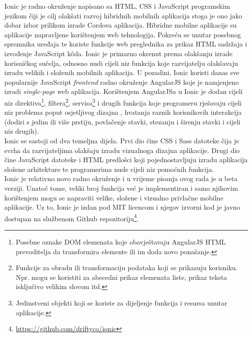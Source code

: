 Ionic je radno okruženje napisano sa HTML, CSS i JavaScript programskim jezikom čiji je cilj olakšati razvoj hibridnih mobilnih aplikacija stoga je ono jako dobar izbor prilikom izrade Cordova aplikacija. 
Hibridne mobilne aplikacije su aplikacije napravljene korištenjem web tehnologija. 
Pokreću se unutar posebnog spremnika uređaja te koriste funkcije web preglednika za prikaz HTML sadržaja i izvođenje JavaScript kôda.
Ionic je primarno okrenut prema olakšanju izrade korisničkog sučelja, odnosno nudi cijeli niz funkcija koje razvijatelju olakšavaju izradu velikih i složenih mobilnih aplikacija. 
U pozadini, Ionic koristi danas sve popularnije JavaScript \textit{frontend} radno okruženje AngularJS koje je namjenjeno izradi \textit{single-page} web aplikacija. 
Korištenjem AngularJSa u Ionic je dodan cijeli niz direktiva\footnote{Posebne oznake DOM elemenata koje obavještavaju AngularJS HTML prevoditelja da transformira elemente ili im doda novo ponašanje.}, filtera\footnote{Funkcije za obradu ili transformaciju podataka koji se prikazuju korisniku. 
Npr. mogu se koristiti za abecedni prikaz elemenata liste, prikaz teksta isključivo velikim slovom itd.}, servisa\footnote{Jedinstveni objekti  koji se koriste za dijeljenje funkcija i resursa unutar aplikacije.} i drugih funkcija koje programeru rješavaju cijeli niz problema poput osjetljivog dizajna , hvatanja raznih korisnikovih interakcija (dodiri s jedim ili više prstiju, povlačenje  stavki, stezanju i širenju stavki  i cijeli niz drugih). 
\\

Ionic se sastoji od dva temeljna dijela. 
Prvi dio čine CSS i Sass datoteke čija je svrha da razvijateljima olakšaju izradu vizualnoga dizajna aplikacije. 
Drugi dio čine JavaScript datoteke i HTML predlošci koji pojednostavljuju izradu aplikacija složene arhitekture te programerima nude cijeli niz pomoćnih funkcija.
\\

Ionic je relativno novo radno okruženje i u vrijeme pisanja ovog rada je u beta verziji. 
Unatoč tome, veliki broj funkcija već je implementiran i samo njihovim korištenjem mogu se napraviti velike, složene i vizualno privlačne mobilne aplikacije. 
Uz to, Ionic je izdan pod MIT licencom i njegov izvorni kod je javno dostupan na službenom Github repozitoriju\footnote{\url{https://github.com/driftyco/ionic}}.